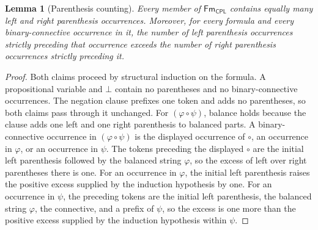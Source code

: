 \documentclass[11pt,oneside,openany]{book}
\theoremstyle{definition}
\theoremstyle{plain}
\newtheorem{lemma}[definition]{Lemma}
\theoremstyle{remark}
\newcommand{\Fm}{\mathsf{Fm}}
\newcommand{\bottom}{\bot}
\newcommand{\CPL}{\mathsf{CPL}}
\begin{document}
\begin{lemma}[Parenthesis counting]
\label{lem:paren-count}
Every member of \(\Fm_{\CPL}\) contains equally many left and right
parenthesis occurrences.  Moreover, for every formula and every
binary-connective occurrence in it, the number of left parenthesis
occurrences strictly preceding that occurrence exceeds the number of right
parenthesis occurrences strictly preceding it.
\end{lemma}
\begin{proof}
Both claims proceed by structural induction on the formula.  A propositional
variable and \(\bottom\) contain no parentheses and no binary-connective
occurrences.  The negation clause prefixes one token and adds no
parentheses, so both claims pass through it unchanged.  For
\((\varphi\circ\psi)\), balance holds because the clause adds one left and
one right parenthesis to balanced parts.  A binary-connective occurrence in
\((\varphi\circ\psi)\) is the displayed occurrence of \(\circ\), an
occurrence in \(\varphi\), or an occurrence in \(\psi\).  The tokens
preceding the displayed \(\circ\) are the initial left parenthesis followed
by the balanced string \(\varphi\), so the excess of left over right
parentheses there is one.  For an occurrence in \(\varphi\), the initial
left parenthesis raises the positive excess supplied by the induction
hypothesis by one.  For an occurrence in \(\psi\), the preceding tokens are
the initial left parenthesis, the balanced string \(\varphi\), the
connective, and a prefix of \(\psi\), so the excess is one more than the
positive excess supplied by the induction hypothesis within \(\psi\).
\end{proof}
\end{document}
